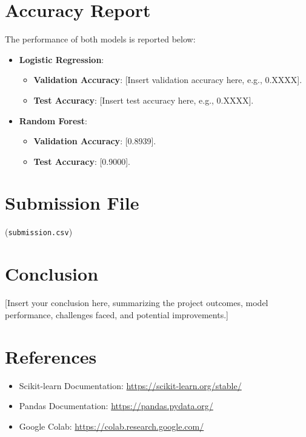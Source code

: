 \documentclass[12pt, a4paper]{article}
\begin{document}
\section{Accuracy Report}
The performance of both models is reported below:

\begin{itemize}
    \item \textbf{Logistic Regression}:
        \begin{itemize}
            \item \textbf{Validation Accuracy}: [Insert validation accuracy here, e.g., 0.XXXX].
            \item \textbf{Test Accuracy}: [Insert test accuracy here, e.g., 0.XXXX].
        \end{itemize}
    \item \textbf{Random Forest}:
        \begin{itemize}
            \item \textbf{Validation Accuracy}: [0.8939].
            \item \textbf{Test Accuracy}: [0.9000].
        \end{itemize}
\end{itemize}

\section{Submission File}
(\texttt{submission.csv})

\section{Conclusion}
[Insert your conclusion here, summarizing the project outcomes, model performance, challenges faced, and potential improvements.]

\section{References}
\begin{itemize}
    \item Scikit-learn Documentation: \url{https://scikit-learn.org/stable/}
    \item Pandas Documentation: \url{https://pandas.pydata.org/}
    \item Google Colab: \url{https://colab.research.google.com/}
\end{itemize}
\end{document}
